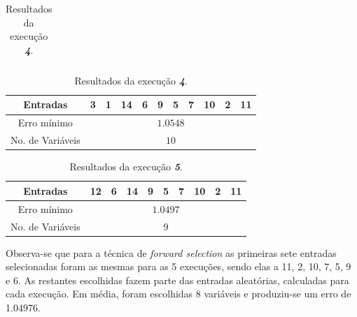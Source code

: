 \begin{enumerate}
\begin{enumerate}
\begin{table}[H]
\begin{minipage}{0.48\textwidth}
\begin{tabular}{|c | c | c | c | c | c | c | c | c | c | c |}
						\end{tabular}	    
					\end{minipage}	    
					\begin{minipage}{0.48\textwidth}
					    \centering
					    \footnotesize
						\caption{\label{tab:backward4_wine} Resultados da execução
						\textit{\textbf{4}}.}
					    \vspace{-6pt}
						\begin{tabular}{|c | c | c | c | c | c | c | c | c| c| c|}
						\hline
						Entradas & 3 & 1 & 14 & 6 & 9 & 5 & 7 & 10 & 2 & 11 \\
						\hline
						Erro mínimo & \multicolumn{10}{c|}{\(1.0548\)}  \\ \hline
						No. de Variáveis & \multicolumn{10}{c|}{\(10\)}  \\
						\hline
						
						\end{tabular}
					\end{minipage}	    
			    \end{table} 
			    
			\vspace{-12pt}

			\begin{table}[H]
				    \centering
				    \footnotesize
					\caption{\label{tab:backward5_wine} Resultados da execução
					\textit{\textbf{5}}.}
				    \vspace{-6pt}
					\begin{tabular}{|c | c | c | c | c | c | c | c | c| c|}
					\hline
					Entradas & 12 & 6 & 14 & 9 & 5 & 7 & 10 & 2 & 11 \\
					\hline
					Erro mínimo & \multicolumn{9}{c|}{\(1.0497\)}  \\ \hline
					No. de Variáveis & \multicolumn{9}{c|}{\(9\)}  \\
					\hline
					
					\end{tabular}	    
			    \end{table} 
	
			    \FloatBarrier
		     
		     Observa-se que para a técnica de \textit{forward selection} as primeiras
		     sete entradas selecionadas foram as mesmas para as 5 execuções, sendo
		     elas a 11, 2, 10, 7, 5, 9 e 6. As restantes escolhidas fazem parte das
		     entradas aleatórias, calculadas para cada execução. Em média, foram
		     escolhidas 8 variáveis e produziu-se um erro de 1.04976.
		     

\end{enumerate}
\end{enumerate}
